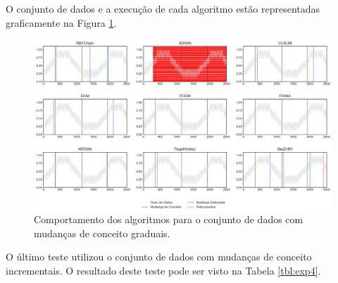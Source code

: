 \documentclass[msc, classic, a4paper]{ufbathesis}
\begin{document}
O conjunto de dados e a execução de cada algoritmo estão representadas graficamente na Figura \ref{fig:exp_gradual}.

\begin{landscape}
\begin{figure}[ht]
\begin{center}
    \includegraphics[scale=0.65]{imagens/gradual.png}
    \caption{Comportamento dos algoritmos para o conjunto de dados com mudanças de conceito graduais.}
    \label{fig:exp_gradual}
\end{center}
\end{figure}
\end{landscape}

O último teste utilizou o conjunto de dados com mudanças de conceito incrementais.
O resultado deste teste pode ser visto na Tabela \ref{tbl:exp4}.
\end{document}
